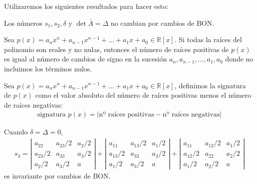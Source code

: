 \documentclass[14pt]{book}
\begin{document}
Utilizaremos los siguientes resultados para hacer esto: 
\begin{tm}
	Los números $s_1, s_2, \delta$ y $\det \bar{A} = \Delta$ no cambian por cambios de BON.
\end{tm}

\begin{tm}
	Sea $p(x) = a_nx^n + a_{n - 1}x^{n-1} + \dots + a_1x + a_0 \in \mathbb{R}[x]$. Si todas la raíces del polinomio son reales y no nulas, entonces el número de raíces positivas de $p(x)$ es igual al número de cambios de signo en la sucesión $a_n, a_{n - 1}, \dots, a_1, a_0$ donde no incluimos los términos nulos.
\end{tm}

\begin{dfn}
	Sea $p(x) = a_nx^n + a_{n - 1}x^{n-1} + \dots + a_1x + a_0 \in \mathbb{R}[x]$, definimos la signatura de $p(x)$ como el valor absoluto del número de raíces positivas menos el número de raíces negativas:
	\begin{align*}
		\text{signatura }p(x) = | \text{nº raíces positivas} - \text{nº raíces negativas}|
	\end{align*}
\end{dfn}

\begin{tm}
	Cuando $\delta = \Delta = 0$,
	\begin{align*}
		s_3 = \left|\begin{array}{ccc}
		a_{22} & a_{23}/2 & a_2/2 \\
		a_{23}/2 & a_{33} & a_3/2 \\
		a_{2}/2 & a_3/2 & a
		\end{array}\right| + \left|\begin{array}{ccc}
		a_{11} & a_{13}/2 & a_1/2 \\
		a_{13}/2 & a_{33}  & a_3/2 \\
		a_{1}/2 & a_3/2 & a
		\end{array}\right| + \left|\begin{array}{ccc}
		a_{11} & a_{12}/2 & a_1/2 \\
		a_{12}/2 & a_{22}  & a_2/2 \\
		a_{1}/2 & a_2/2 & a
		\end{array}\right|
	\end{align*}
	es invariante por cambios de BON.
\end{tm}
\end{document}
